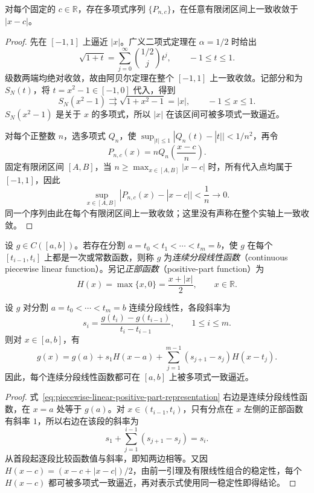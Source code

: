 \begin{lemma}[绝对值函数的多项式逼近]
\label{lem:absolute-value-polynomial-approximation}
对每个固定的 $c\in\mathbb R$，存在多项式序列 $\{P_{n,c}\}$，在任意有限闭区间上一致收敛于 $|x-c|$。
\end{lemma}

\begin{proof}
先在 $[-1,1]$ 上逼近 $|x|$。广义二项式定理在 $\alpha=1/2$ 时给出
\[
    \sqrt{1+t}=\sum_{j=0}^\infty\binom{1/2}j t^j,
    \qquad -1\leq t\leq1.
\]
级数两端均绝对收敛，故由阿贝尔定理在整个 $[-1,1]$ 上一致收敛。记部分和为 $S_N(t)$，将 $t=x^2-1\in[-1,0]$ 代入，得到
\[
    S_N(x^2-1)\rightrightarrows\sqrt{1+x^2-1}=|x|,
    \qquad -1\leq x\leq1.
\]
$S_N(x^2-1)$ 是关于 $x$ 的多项式，所以 $|x|$ 在该区间可被多项式一致逼近。

对每个正整数 $n$，选多项式 $Q_n$，使 $\sup_{|t|\leq1}|Q_n(t)-|t||<1/n^2$，再令
\[
    P_{n,c}(x)=nQ_n\left(\frac{x-c}{n}\right).
\]
固定有限闭区间 $[A,B]$，当 $n\geq\max_{x\in[A,B]}|x-c|$ 时，所有代入点均属于 $[-1,1]$，因此
\[
    \sup_{x\in[A,B]}|P_{n,c}(x)-|x-c||<\frac1n\longrightarrow0.
\]
同一个序列由此在每个有限闭区间上一致收敛；这里没有声称在整个实轴上一致收敛。
\end{proof}

\begin{definition}
\label{def:continuous-piecewise-linear-function}
设 $g\in C([a,b])$。若存在分割 $a=t_0<t_1<\cdots<t_m=b$，使 $g$ 在每个 $[t_{i-1},t_i]$ 上都是一次或常数函数，则称 $g$ 为\emph{连续分段线性函数}（continuous piecewise linear function）。另记\emph{正部函数}（positive-part function）为
\[
    H(x)=\max\{x,0\}=\frac{x+|x|}{2},\qquad x\in\mathbb R.
\]
\end{definition}

\begin{lemma}[分段线性函数的表示与逼近]
\label{lem:piecewise-linear-hinge-representation}
设 $g$ 对分割 $a=t_0<\cdots<t_m=b$ 连续分段线性，各段斜率为
\[
    s_i=\frac{g(t_i)-g(t_{i-1})}{t_i-t_{i-1}},\qquad 1\leq i\leq m.
\]
则对 $x\in[a,b]$，有
\begin{equation}
    g(x)=g(a)+s_1H(x-a)
       +\sum_{j=1}^{m-1}(s_{j+1}-s_j)H(x-t_j).
    \label{eq:piecewise-linear-positive-part-representation}
\end{equation}
因此，每个连续分段线性函数都可在 $[a,b]$ 上被多项式一致逼近。
\end{lemma}

\begin{proof}
式~\eqref{eq:piecewise-linear-positive-part-representation} 右边是连续分段线性函数，在 $x=a$ 处等于 $g(a)$。对 $x\in(t_{i-1},t_i)$，只有分点在 $x$ 左侧的正部函数有斜率 $1$，所以右边在该段的斜率为
\[
    s_1+\sum_{j=1}^{i-1}(s_{j+1}-s_j)=s_i.
\]
从首段起逐段比较函数值与斜率，即知两边相等。又因 $H(x-c)=(x-c+|x-c|)/2$，由前一引理及有限线性组合的稳定性，每个 $H(x-c)$ 都可被多项式一致逼近，再对表示式使用同一稳定性即得结论。
\end{proof}

